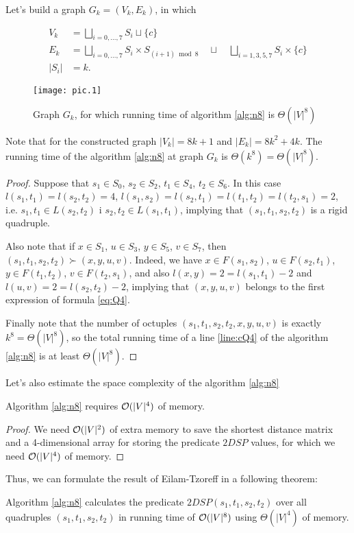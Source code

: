 \begin{theorem}
Let's build a graph $G_k = (V_k, E_k)$, in which

\begin{align}
V_k &= \bigsqcup\limits_{i = 0,\ldots,7} S_i \sqcup \{c\} \\
E_k &= \bigsqcup\limits_{i = 0,\ldots,7} S_i \times S_{(i+1) \bmod 8} \quad\sqcup\quad \bigsqcup\limits_{i=1,3,5,7} S_i \times \{c\} \\
|S_i| &= k.
\end{align}

\begin{figure}[H]
\caption{Graph $G_k$, for which running time of algorithm \ref{alg:n8} is $\Theta(|V|^8)$}
\centering
\texttt{[image: pic.1]}
\end{figure}

Note that for the constructed graph $|V_k| = 8k + 1$ and $|E_k| = 8k^2 + 4k$. The running time of the algorithm \ref{alg:n8} at graph $G_k$ is $\Theta(k^8) = \Theta(|V|^8)$.

\end{theorem}
\begin{proof}
Suppose that $s_1 \in S_0$, $s_2 \in S_2$, $t_1 \in S_4$, $t_2 \in S_6$. In this case $l(s_1, t_1) = l(s_2, t_2) = 4$, $l(s_1, s_2) = l(s_2, t_1) = l(t_1, t_2) = l(t_2, s_1) = 2$, i.e. $s_1, t_1 \in L(s_2, t_2)$ i $s_2, t_2 \in L(s_1, t_1)$, implying that $(s_1, t_1, s_2, t_2)$ is a rigid quadruple.

Also note that if $x \in S_1$, $u \in S_3$, $y \in S_5$, $v \in S_7$, then $(s_1, t_1, s_2, t_2) \succ (x, y, u, v)$. Indeed, we have $x \in F(s_1, s_2)$, $u \in F(s_2, t_1)$, $y \in F(t_1, t_2)$, $v \in F(t_2, s_1)$, and also $l(x, y) = 2 = l(s_1, t_1) - 2$ and $l(u, v) = 2 = l(s_2, t_2) - 2$, implying that $(x, y, u, v)$ belongs to the first expression of formula \ref{eq:Q4}.

Finally note that the number of octuples $(s_1, t_1, s_2, t_2, x, y, u, v)$ is exactly $k^8 = \Theta(|V|^8)$, so the total running time of a line \ref{line:cQ4} of the algorithm \ref{alg:n8} is at least $\Theta(|V|^8)$.
\end{proof}

Let's also estimate the space complexity of the algorithm \ref{alg:n8}
\begin{theorem}
Algorithm \ref{alg:n8} requires $\mathcal{O}(|V|^4)$ of memory.
\end{theorem}
\begin{proof}
We need $\mathcal{O}(|V|^2)$ of extra memory to save the shortest distance matrix and a 4-dimensional array for storing the predicate $2DSP$ values, for which we need $\mathcal{O}(|V|^4)$ of memory.
\end{proof}

Thus, we can formulate the result of Eilam-Tzoreff in a following theorem: 

\begin{theorem} 
Algorithm \ref{alg:n8} calculates the predicate $2DSP(s_1, t_1, s_2, t_2)$ over all quadruples $(s_1, t_1, s_2, t_2)$ in running time of $\mathcal{O}(|V|^8)$ using $\Theta(|V|^4)$ of memory. 
\end{theorem}
